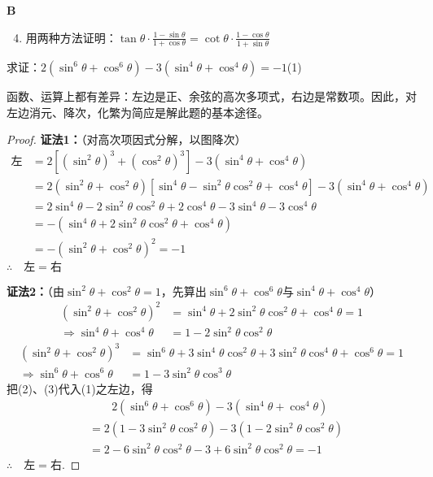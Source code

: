 \begin{center}
    \bfseries B
\end{center}
\begin{enumerate}\setcounter{enumi}{3}
    \item 用两种方法证明：$\tan\theta\cdot \frac{1-\sin\theta}{1+\cos\theta}=\cot\theta\cdot \frac{1-\cos\theta}{1+\sin\theta}$
\end{enumerate}


\begin{example}
求证：$2(\sin^6\theta+\cos^6\theta)-3(\sin^4\theta+\cos^4\theta)=-1$\hfill(1)
\end{example}

\begin{analyze}
函数、运算上都有差异：左边是正、余弦的高次多项式，右边是常数项。因此，对左边消元、降次，化繁为简应是解此题的基本途径。
\end{analyze}

\begin{proof}
\textbf{证法1：}（对高次项因式分解，以图降次） 
\[\begin{split}
\text{左边}&=2[(\sin^{2}\theta)^{3}+(\cos^{2}\theta)^{3}]-3(\sin^{4}\theta+\cos^{4}\theta)\\&=2(\sin^{2}\theta+\cos^{2}\theta)[\sin^{4}\theta-\sin^{2}\theta\cos^{2}\theta+\cos^{4}\theta]-3(\sin^{4}\theta+\cos^{4}\theta)\\
&=2\sin ^{4}\theta-2\sin ^{2}\theta\cos^{2}\theta+2\cos^{4}\theta-3\sin^{4}\theta-3\cos^{4}\theta\\&=-(\sin^{4}\theta+2\sin ^{2}\theta\cos^{2}\theta+\cos^{4}\theta)\\
&=-(\sin^{2}\theta+\cos^{2}\theta)^{2}=-1
\end{split}\]
$\therefore\quad \text{左}=\text{右}$

\textbf{证法2：}（由$\sin ^{2}\theta+\cos^{2}\theta=1$，先算出$\sin^6\theta+\cos^6\theta$与$\sin^4\theta+\cos^4\theta$）
\begin{align}
(\sin ^{2}\theta+\cos^{2}\theta)^2&= \sin^{4}\theta+2\sin ^{2}\theta\cos^{2}\theta+\cos^{4}\theta=1\nonumber\\
\Rightarrow \sin ^{4}\theta+\cos^{4}\theta&=1-2\sin ^{2}\theta\cos^{2}\theta\tag{2}
\end{align}
\begin{align}
(\sin ^{2}\theta+\cos^{2}\theta)^3&= \sin^{6}\theta+3\sin ^{4}\theta\cos^{2}\theta+3\sin ^{2}\theta\cos^{4}\theta+\cos^{6}\theta=1\nonumber\\
\Rightarrow \sin ^{6}\theta+\cos^{6}\theta&=1-3\sin ^{2}\theta\cos^{3}\theta\tag{3}
\end{align}
把(2)、(3)代入(1)之左边，得
\[\begin{split}
&\qquad 2(\sin^6\theta +\cos^6\theta )-3(\sin^4\theta +\cos^4\theta )\\
&=2(1-3\sin^2\theta \cos^2\theta)-3(1-2\sin^2\theta \cos^2\theta)\\
&=2-6\sin^2\theta\cos^2\theta -3+6\sin^2\theta \cos^2\theta=-1    
\end{split}\]
$\therefore\quad \text{左}=\text{右}$.
\end{proof}

